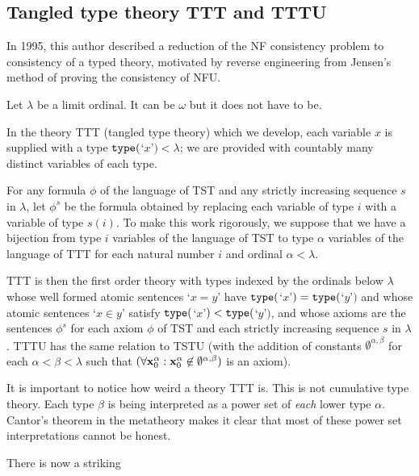 \documentclass[12pt]{article}
\begin{document}
\newpage

\subsection{Tangled type theory TTT and TTTU}

In 1995, this author described a reduction of the NF consistency problem to consistency of a typed theory,  motivated by reverse engineering from Jensen's method of proving the consistency of NFU.

Let $\lambda$ be a limit ordinal.  It can be $\omega$ but it does not have to be.  

In the theory TTT (tangled type theory) which we develop, each variable $x$ is supplied with a type ${\tt type}($`$x$'$) <\lambda$;  we are provided with countably many distinct variables of each type.

For any formula $\phi$ of the language of TST and any strictly increasing sequence $s$ in $\lambda$, let $\phi^s$ be the formula obtained by replacing each variable
of type $i$ with a variable of type $s(i)$.  To make this work rigorously, we suppose that we have a bijection from type $i$ variables of the language of TST to type $\alpha$ variables
of the language of TTT for each natural number $i$ and ordinal $\alpha<\lambda$.

TTT is then the first order theory with types indexed by the ordinals below $\lambda$ whose well formed atomic sentences `$x=y$' have ${\tt type}($`$x$'$) = {\tt type}($`$y$'$)$ and whose atomic sentences `$x \in y$' satisfy ${\tt type}($`$x$'$) < {\tt type}($`$y$'$)$, and whose axioms are the sentences $\phi^s$ for each axiom $\phi$ of TST and each strictly increasing sequence $s$ in $\lambda$.  TTTU has the same relation to TSTU (with the addition of constants $\emptyset^{\alpha,\beta}$ for each $\alpha<\beta<\lambda$  such that $(\forall {\bf x}_0^{\alpha} :{\bf x}_0^{\alpha}\not\in \emptyset^{\alpha,\beta})$ is an axiom).

It is important to notice how weird a theory TTT is.  This is not cumulative type theory.  Each type $\beta$ is being interpreted as a power set of {\em each\/} lower type $\alpha$.  Cantor's theorem in the metatheory makes it clear that most of these power set interpretations cannot be honest.

There is now a striking
\end{document}
